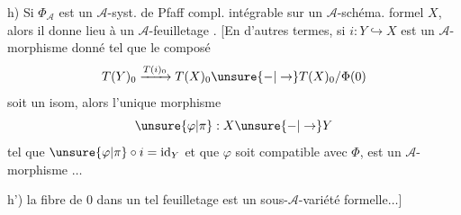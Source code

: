 h) Si $\Phi_{\mathcal A}$ est un $\mathcal A$-syst. de Pfaff compl. intégrable sur un $\mathcal A$-schéma. formel $X$, alors il donne lieu à un $\mathcal A$-feuilletage .
[En d'autres termes, si $i:Y\hookrightarrow X$ est un $\mathcal A$-morphisme donné tel que le composé
\[
T(Y)_0\xrightarrow{T(i)_0}T(X)_0\unsure{-|\to}T(X)_0/\Phi(0)
\]
soit un isom, alors l'unique morphisme
\[
\unsure{\varphi|\pi}:X\unsure{-|\to}Y
\]
tel que $\unsure{\varphi|\pi}\circ i=\operatorname{id}_Y$ et que $\varphi$ soit compatible avec $\Phi$, est un $\mathcal A$-morphisme $\ldots$

h') la fibre de $0$ dans un tel feuilletage est un sous-$\mathcal A$-variété formelle$\ldots$]


